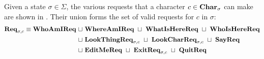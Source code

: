 Given a state $\sigma \in \Sigma$, the various requests that a
 character $c \in \textbf{Char}_{\sigma}$ can make are shown
 in . Their union forms the set of valid requests for
 $c$ in $\sigma$:
\begin{align*}
  \textbf{Req}_{\sigma,c} \equiv \textbf{WhoAmIReq}
  ~\sqcup~ & \textbf{WhereAmIReq}
  ~\sqcup~ \textbf{WhatIsHereReq}
  ~\sqcup~ \textbf{WhoIsHereReq} \\
  ~\sqcup~ & \textbf{LookThingReq}_{\sigma,c}
  ~\sqcup~ \textbf{LookCharReq}_{\sigma,c}
  ~\sqcup~ \textbf{SayReq} \\
  ~\sqcup~ & \textbf{EditMeReq}
  ~\sqcup~ \textbf{ExitReq}_{\sigma,c}
  ~\sqcup~ \textbf{QuitReq}
\end{align*}

